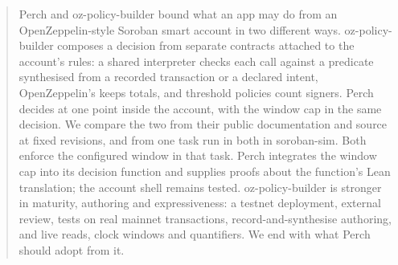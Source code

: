 \begin{abstract}
Perch and oz-policy-builder bound what an app may do from an OpenZeppelin-style
Soroban smart account in two different ways. oz-policy-builder composes a
decision from separate contracts attached to the account's rules: a shared
interpreter checks each call against a predicate synthesised from a recorded
transaction or a declared intent, OpenZeppelin's  keeps
totals, and threshold policies count signers. Perch decides at one point inside
the account, with the window cap in the same decision. We compare the two from
their public documentation and source at fixed revisions, and from one task run
in both in soroban-sim. Both enforce the configured window in that task.
Perch integrates the window cap into its decision function and supplies proofs
about the function's Lean translation; the account shell remains tested.
oz-policy-builder is stronger in maturity, authoring and expressiveness: a
testnet deployment, external review, tests on real mainnet transactions,
record-and-synthesise authoring, and live reads, clock windows and quantifiers.
We end with what Perch should adopt from it.
\end{abstract}
